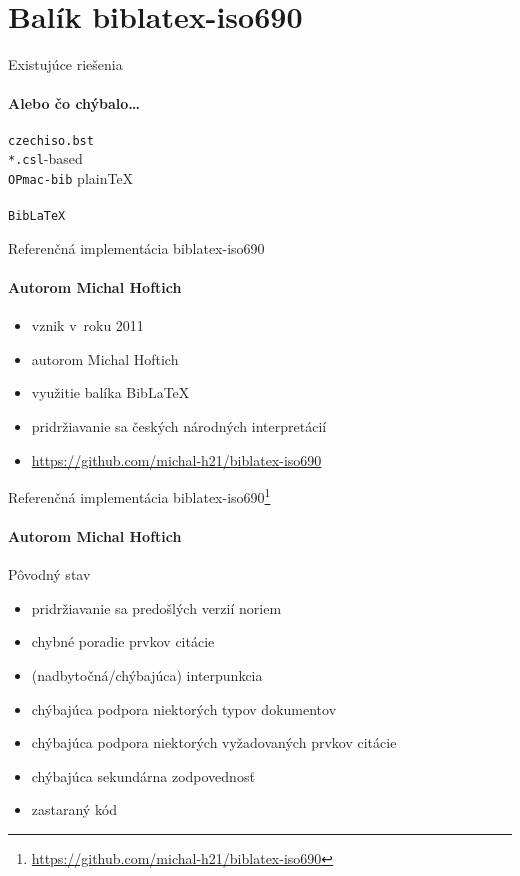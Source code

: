 \documentclass{beamer}
\begin{document}




\section{Balík biblatex-iso690}

\begin{frame}{Existujúce riešenia}
\framesubtitle{Alebo čo chýbalo\dots}

\texttt{czechiso.bst}\\
\texttt{*.csl}-based\\
\texttt{OPmac-bib} plainTeX\\
\\
\texttt{BibLaTeX}

\end{frame}

\begin{frame}{Referenčná implementácia \textsf{biblatex-iso690}}
\framesubtitle{Autorom Michal Hoftich}
\begin{itemize}
\item vznik v~roku 2011
\item autorom Michal Hoftich
\item využitie balíka BibLaTeX
\item pridržiavanie sa českých národných interpretácií
\item \url{https://github.com/michal-h21/biblatex-iso690}
\end{itemize}
\end{frame}

\begin{frame}{Referenčná implementácia \textsf{biblatex-iso690}\footnote[frame]{\url{https://github.com/michal-h21/biblatex-iso690}}}
\framesubtitle{Autorom Michal Hoftich}
Pôvodný stav
\begin{itemize}
\item pridržiavanie sa predošlých verzií noriem %
\item chybné poradie prvkov citácie %
\item (nadbytočná/chýbajúca) interpunkcia %
\item chýbajúca podpora niektorých typov dokumentov %
\item chýbajúca podpora niektorých vyžadovaných prvkov citácie %
\item chýbajúca sekundárna zodpovednosť %
\item zastaraný kód %
\end{itemize}
\end{frame}
\end{document}

